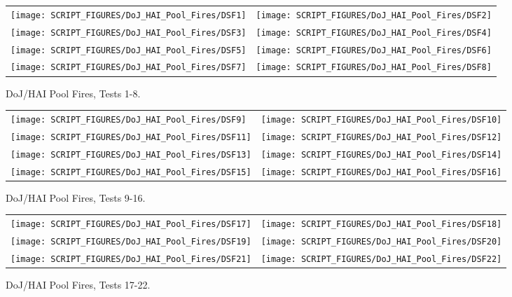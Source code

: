 \begin{figure}[p]
\begin{tabular*}{\textwidth}{l@{\extracolsep{\fill}}r}
\texttt{[image: SCRIPT\_FIGURES/DoJ\_HAI\_Pool\_Fires/DSF1]} &
\texttt{[image: SCRIPT\_FIGURES/DoJ\_HAI\_Pool\_Fires/DSF2]} \\
\texttt{[image: SCRIPT\_FIGURES/DoJ\_HAI\_Pool\_Fires/DSF3]} &
\texttt{[image: SCRIPT\_FIGURES/DoJ\_HAI\_Pool\_Fires/DSF4]} \\
\texttt{[image: SCRIPT\_FIGURES/DoJ\_HAI\_Pool\_Fires/DSF5]} &
\texttt{[image: SCRIPT\_FIGURES/DoJ\_HAI\_Pool\_Fires/DSF6]} \\
\texttt{[image: SCRIPT\_FIGURES/DoJ\_HAI\_Pool\_Fires/DSF7]} &
\texttt{[image: SCRIPT\_FIGURES/DoJ\_HAI\_Pool\_Fires/DSF8]}  
\end{tabular*}
\caption[DoJ/HAI Pool Fires, Tests 1-8]{DoJ/HAI Pool Fires, Tests 1-8.}
\label{DoJ_HAI_Pool_Fires_1}
\end{figure}

\begin{figure}[p]
\begin{tabular*}{\textwidth}{l@{\extracolsep{\fill}}r}
\texttt{[image: SCRIPT\_FIGURES/DoJ\_HAI\_Pool\_Fires/DSF9]} &
\texttt{[image: SCRIPT\_FIGURES/DoJ\_HAI\_Pool\_Fires/DSF10]} \\
\texttt{[image: SCRIPT\_FIGURES/DoJ\_HAI\_Pool\_Fires/DSF11]} &
\texttt{[image: SCRIPT\_FIGURES/DoJ\_HAI\_Pool\_Fires/DSF12]} \\
\texttt{[image: SCRIPT\_FIGURES/DoJ\_HAI\_Pool\_Fires/DSF13]} &
\texttt{[image: SCRIPT\_FIGURES/DoJ\_HAI\_Pool\_Fires/DSF14]} \\
\texttt{[image: SCRIPT\_FIGURES/DoJ\_HAI\_Pool\_Fires/DSF15]} &
\texttt{[image: SCRIPT\_FIGURES/DoJ\_HAI\_Pool\_Fires/DSF16]}
\end{tabular*}
\caption[DoJ/HAI Pool Fires, Tests 9-16]{DoJ/HAI Pool Fires, Tests 9-16.}
\label{DoJ_HAI_Pool_Fires_2}
\end{figure}

\begin{figure}[p]
\begin{tabular*}{\textwidth}{l@{\extracolsep{\fill}}r}
\texttt{[image: SCRIPT\_FIGURES/DoJ\_HAI\_Pool\_Fires/DSF17]} &
\texttt{[image: SCRIPT\_FIGURES/DoJ\_HAI\_Pool\_Fires/DSF18]} \\
\texttt{[image: SCRIPT\_FIGURES/DoJ\_HAI\_Pool\_Fires/DSF19]} &
\texttt{[image: SCRIPT\_FIGURES/DoJ\_HAI\_Pool\_Fires/DSF20]} \\
\texttt{[image: SCRIPT\_FIGURES/DoJ\_HAI\_Pool\_Fires/DSF21]} &
\texttt{[image: SCRIPT\_FIGURES/DoJ\_HAI\_Pool\_Fires/DSF22]}
\end{tabular*}
\caption[DoJ/HAI Pool Fires, Tests 17-22]{DoJ/HAI Pool Fires, Tests 17-22.}
\label{DoJ_HAI_Pool_Fires_3}
\end{figure}

